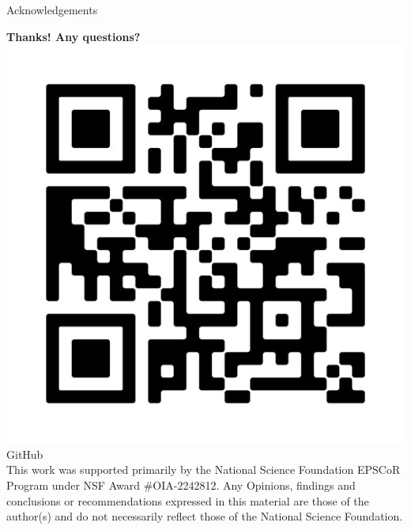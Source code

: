 \documentclass[9pt, dvipsnames]{beamer}
\begin{document}
\begin{frame}{Acknowledgements}
    \begin{center}
        {\Large \textbf{\color{st} Thanks! Any questions?}} \\
        \bigskip
        \includegraphics[height=0.2\paperheight]{assets/repo-qr.png} \\
        {\color{st} GitHub} \\
        \bigskip
        { \scriptsize
        This work was supported primarily by the National Science Foundation
        EPSCoR Program under NSF Award \#OIA-2242812. Any Opinions, findings
        and conclusions or recommendations expressed in this material are
        those of the author(s) and do not necessarily reflect those of the
        National Science Foundation.
        }
    \end{center}
\end{frame}
\end{document}
